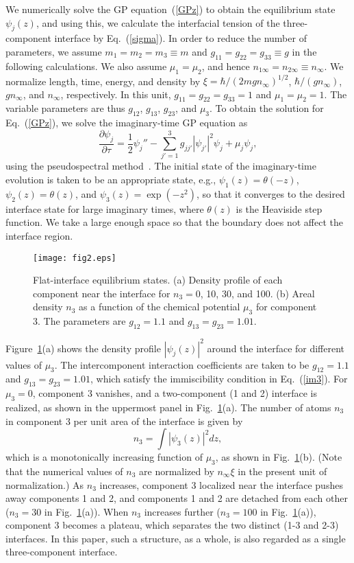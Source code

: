\documentclass[pra,aps,superscriptaddress,twocolumn,color]{revtex4-1}
\begin{document}
We numerically solve the GP equation~(\ref{GPz}) to obtain the equilibrium
state $\psi_j(z)$, and using this, we calculate the interfacial tension of
the three-component interface by Eq.~(\ref{sigma}).
In order to reduce the number of parameters, we assume $m_1 = m_2 = m_3
\equiv m$ and $g_{11} = g_{22} = g_{33} \equiv g$ in the following
calculations.
We also assume $\mu_1 = \mu_2$, and hence $n_{1\infty} = n_{2\infty} \equiv
n_\infty$.
We normalize length, time, energy, and density by $\xi = \hbar /
(2mgn_\infty)^{1/2}$, $\hbar / (gn_\infty)$, $gn_\infty$, and $n_\infty$,
respectively.
In this unit, $g_{11} = g_{22} = g_{33} = 1$ and $\mu_1 = \mu_2 = 1$.
The variable parameters are thus $g_{12}$, $g_{13}$, $g_{23}$, and $\mu_3$.
To obtain the solution for Eq.~(\ref{GPz}), we solve the imaginary-time GP
equation as
\begin{equation} \label{imagtime}
  \frac{\partial \psi_j}{\partial \tau} = \frac{1}{2} \psi_j''
  - \sum_{j' = 1}^3 g_{jj'} |\psi_{j'}|^2 \psi_j + \mu_j \psi_j,
\end{equation}
using the pseudospectral method~\cite{recipe}.
The initial state of the imaginary-time evolution is taken to be an
appropriate state, e.g., $\psi_1(z) = \theta(-z)$, $\psi_2(z) = \theta(z)$,
and $\psi_3(z) = \exp(-z^2)$, so that it converges to the desired interface
state for large imaginary times, where $\theta(z)$ is the Heaviside step
function.
We take a large enough space so that the boundary does not affect the
interface region.

\begin{figure}[tb]
\texttt{[image: fig2.eps]}
\caption{
Flat-interface equilibrium states.
(a) Density profile of each component near the interface for $n_3 = 0$, 10,
30, and 100.
(b) Areal density $n_3$ as a function of the chemical potential $\mu_3$ for
component 3.
The parameters are $g_{12} = 1.1$ and $g_{13} = g_{23} = 1.01$.
}
\label{f:shape}
\end{figure}
Figure~\ref{f:shape}(a) shows the density profile $|\psi_j(z)|^2$ around the
interface for different values of $\mu_3$.
The intercomponent interaction coefficients are taken to be $g_{12} = 1.1$
and $g_{13} = g_{23} = 1.01$, which satisfy the immiscibility condition in
Eq.~(\ref{im3}).
For $\mu_3 = 0$, component 3 vanishes, and a two-component (1 and 2)
interface is realized, as shown in the uppermost panel in
Fig.~\ref{f:shape}(a).
The number of atoms $n_3$ in component 3 per unit area of the interface is
given by
\begin{equation}
n_3 = \int |\psi_3(z)|^2 dz,
\end{equation}
which is a monotonically increasing function of $\mu_3$, as shown in
Fig.~\ref{f:shape}(b).
(Note that the numerical values of $n_3$ are normalized by $n_{\infty}
\xi$ in the present unit of normalization.)
As $n_3$ increases, component 3 localized near the interface pushes away
components 1 and 2, and components 1 and 2 are detached from each other
($n_3 = 30$ in Fig.~\ref{f:shape}(a)).
When $n_3$ increases further ($n_3 = 100$ in Fig.~\ref{f:shape}(a)),
component 3 becomes a plateau, which separates the two distinct (1-3 and
2-3) interfaces.
In this paper, such a structure, as a whole, is also regarded as a single
three-component interface.
\end{document}
